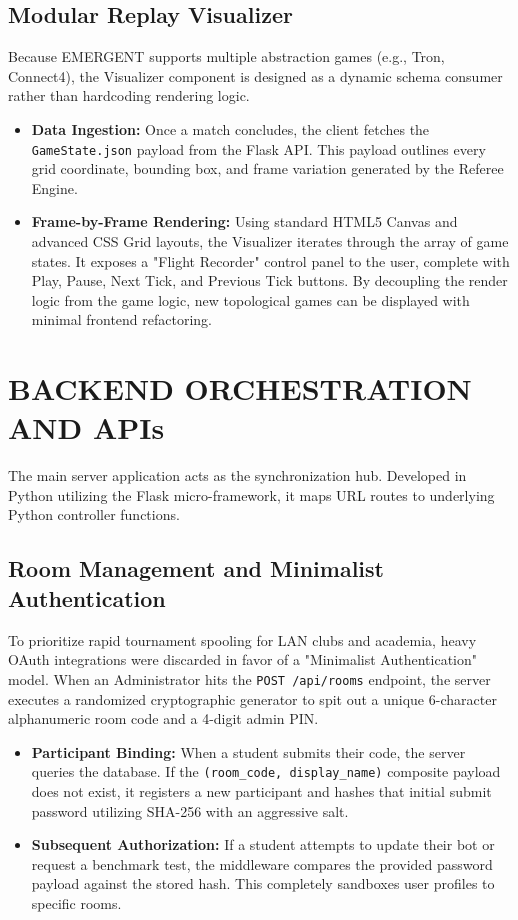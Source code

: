 \documentclass[12pt,a4paper]{report}
\begin{document}
\subsection{Modular Replay Visualizer}
Because EMERGENT supports multiple abstraction games (e.g., Tron, Connect4), the Visualizer component is designed as a dynamic schema consumer rather than hardcoding rendering logic. 
\begin{itemize}
    \item \textbf{Data Ingestion:} Once a match concludes, the client fetches the \texttt{GameState.json} payload from the Flask API. This payload outlines every grid coordinate, bounding box, and frame variation generated by the Referee Engine.
    \item \textbf{Frame-by-Frame Rendering:} Using standard HTML5 Canvas and advanced CSS Grid layouts, the Visualizer iterates through the array of game states. It exposes a "Flight Recorder" control panel to the user, complete with Play, Pause, Next Tick, and Previous Tick buttons. By decoupling the render logic from the game logic, new topological games can be displayed with minimal frontend refactoring.
\end{itemize}

\section{BACKEND ORCHESTRATION AND APIs}
The main server application acts as the synchronization hub. Developed in Python utilizing the Flask micro-framework, it maps URL routes to underlying Python controller functions.

\subsection{Room Management and Minimalist Authentication}
To prioritize rapid tournament spooling for LAN clubs and academia, heavy OAuth integrations were discarded in favor of a "Minimalist Authentication" model. 
When an Administrator hits the \texttt{POST /api/rooms} endpoint, the server executes a randomized cryptographic generator to spit out a unique 6-character alphanumeric room code and a 4-digit admin PIN.
\begin{itemize}
    \item \textbf{Participant Binding:} When a student submits their code, the server queries the database. If the \texttt{(room\_code, display\_name)} composite payload does not exist, it registers a new participant and hashes that initial submit password utilizing SHA-256 with an aggressive salt. 
    \item \textbf{Subsequent Authorization:} If a student attempts to update their bot or request a benchmark test, the middleware compares the provided password payload against the stored hash. This completely sandboxes user profiles to specific rooms.
\end{itemize}
\end{document}
